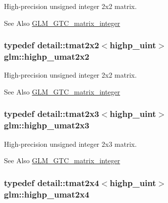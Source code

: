 High-\/precision unsigned integer 2x2 matrix. 

\begin{DoxySeeAlso}{See Also}
\hyperlink{group__gtc__matrix__integer}{G\-L\-M\-\_\-\-G\-T\-C\-\_\-matrix\-\_\-integer} 
\end{DoxySeeAlso}
\hypertarget{group__gtc__matrix__integer_ga3d03c649a79dcf3c8b3f766e1c5e7870}{
\subsubsection[{highp\-\_\-umat2x2}]{\setlength{\rightskip}{0pt plus 5cm}typedef detail\-::tmat2x2$<$highp\-\_\-uint$>$ {\bf glm\-::highp\-\_\-umat2x2}}}\label{group__gtc__matrix__integer_ga3d03c649a79dcf3c8b3f766e1c5e7870}


High-\/precision unsigned integer 2x2 matrix. 

\begin{DoxySeeAlso}{See Also}
\hyperlink{group__gtc__matrix__integer}{G\-L\-M\-\_\-\-G\-T\-C\-\_\-matrix\-\_\-integer} 
\end{DoxySeeAlso}
\hypertarget{group__gtc__matrix__integer_ga423c173624bfed5e27073987eecf06c2}{
\subsubsection[{highp\-\_\-umat2x3}]{\setlength{\rightskip}{0pt plus 5cm}typedef detail\-::tmat2x3$<$highp\-\_\-uint$>$ {\bf glm\-::highp\-\_\-umat2x3}}}\label{group__gtc__matrix__integer_ga423c173624bfed5e27073987eecf06c2}


High-\/precision unsigned integer 2x3 matrix. 

\begin{DoxySeeAlso}{See Also}
\hyperlink{group__gtc__matrix__integer}{G\-L\-M\-\_\-\-G\-T\-C\-\_\-matrix\-\_\-integer} 
\end{DoxySeeAlso}
\hypertarget{group__gtc__matrix__integer_ga6989ecc7d0dda60f3c9c9465e9243a78}{
\subsubsection[{highp\-\_\-umat2x4}]{\setlength{\rightskip}{0pt plus 5cm}typedef detail\-::tmat2x4$<$highp\-\_\-uint$>$ {\bf glm\-::highp\-\_\-umat2x4}}}\label{group__gtc__matrix__integer_ga6989ecc7d0dda60f3c9c9465e9243a78}


